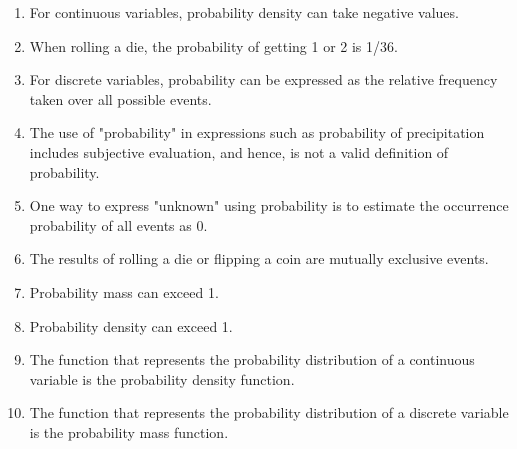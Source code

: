 \begin{enumerate}
	\item For continuous variables, probability density can take negative values.
	\item When rolling a die, the probability of getting 1 or 2 is 1/36.
	\item For discrete variables, probability can be expressed as the relative frequency taken over all possible events.
	\item The use of "probability" in expressions such as probability of precipitation includes subjective evaluation, and hence, is not a valid definition of probability.
	\item One way to express "unknown" using probability is to estimate the occurrence probability of all events as 0.
	\item The results of rolling a die or flipping a coin are mutually exclusive events.
	\item Probability mass can exceed 1.
	\item Probability density can exceed 1.
	\item The function that represents the probability distribution of a continuous variable is the probability density function.
	\item The function that represents the probability distribution of a discrete variable is the probability mass function.
\end{enumerate}
